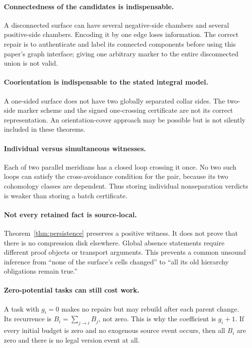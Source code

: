\documentclass[11pt]{article}
\theoremstyle{definition}
\begin{document}
\paragraph{Connectedness of the candidates is indispensable.}
A disconnected surface can have several negative-side chambers and several positive-side chambers. Encoding it by one edge loses information. The correct repair is to authenticate and label its connected components before using this paper's graph interface; giving one arbitrary marker to the entire disconnected union is not valid.

\paragraph{Coorientation is indispensable to the stated integral model.}
A one-sided surface does not have two globally separated collar sides. The two-side marker scheme and the signed one-crossing certificate are not its correct representation. An orientation-cover approach may be possible but is not silently included in these theorems.

\paragraph{Individual versus simultaneous witnesses.}
Each of two parallel meridians has a closed loop crossing it once. No two such loops can satisfy the cross-avoidance condition for the pair, because its two cohomology classes are dependent. Thus storing individual nonseparation verdicts is weaker than storing a batch certificate.

\paragraph{Not every retained fact is source-local.}
Theorem~\ref{thm:persistence} preserves a positive witness. It does not prove that there is no compression disk elsewhere. Global absence statements require different proof objects or transport arguments. This prevents a common unsound inference from ``none of the surface's cells changed'' to ``all its old hierarchy obligations remain true.''

\paragraph{Zero-potential tasks can still cost work.}
A task with $g_i=0$ makes no repairs but may rebuild after each parent change. Its recurrence is $B_i=\sum_{j\to i}B_j$, not zero. This is why the coefficient is $g_i+1$. If every initial budget is zero and no exogenous source event occurs, then all $B_i$ are zero and there is no legal version event at all.
\end{document}
